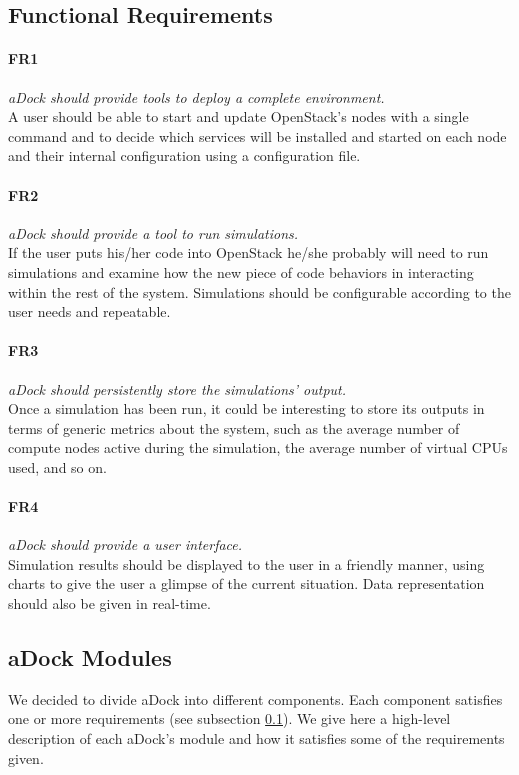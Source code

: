\subsection{Functional Requirements}
\label{sub:func_req}

\paragraph{FR1}\label{p:fr1} \emph{aDock should provide tools to deploy a complete environment.} \hfill \\
A user should be able to start and update OpenStack's nodes with a single command and to decide which services will be installed and started on each node and their internal configuration using a configuration file.

\paragraph{FR2}\label{p:fr2} \emph{aDock should provide a tool to run simulations.} \hfill \\
If the user puts his/her code into OpenStack he/she probably will need to run simulations and examine how the new piece of code behaviors in interacting within the rest of the system. Simulations should be configurable according to the user needs and repeatable.

\paragraph{FR3}\label{p:fr3} \emph{aDock should persistently store the simulations' output.} \hfill \\
Once a simulation has been run, it could be interesting to store its outputs in terms of generic metrics about the system, such as the average number of compute nodes active during the simulation, the average number of virtual CPUs used, and so on.

\paragraph{FR4}\label{p:fr4} \emph{aDock should provide a user interface.} \hfill \\
Simulation results should be displayed to the user in a friendly manner, using charts to give the user a glimpse of the current situation. Data representation should also be given in real-time.

\subsection{aDock Modules}
\label{sub:adock_modules}
We decided to divide aDock into different components. Each component satisfies one or more requirements (see subsection \ref{sub:func_req}). We give here a high-level description of each aDock's module and how it satisfies some of the requirements given.

